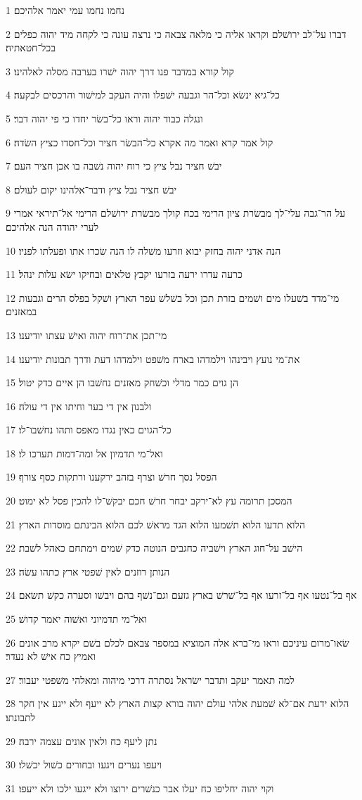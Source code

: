 \par 1 נחמו נחמו עמי יאמר אלהיכם׃
\par 2 דברו על־לב ירושׁלם וקראו אליה כי מלאה צבאה כי נרצה עונה כי לקחה מיד יהוה כפלים בכל־חטאתיה׃
\par 3 קול קורא במדבר פנו דרך יהוה ישׁרו בערבה מסלה לאלהינו׃
\par 4 כל־גיא ינשׂא וכל־הר וגבעה ישׁפלו והיה העקב למישׁור והרכסים לבקעה׃
\par 5 ונגלה כבוד יהוה וראו כל־בשׂר יחדו כי פי יהוה דבר׃
\par 6 קול אמר קרא ואמר מה אקרא כל־הבשׂר חציר וכל־חסדו כציץ השׂדה׃
\par 7 יבשׁ חציר נבל ציץ כי רוח יהוה נשׁבה בו אכן חציר העם׃
\par 8 יבשׁ חציר נבל ציץ ודבר־אלהינו יקום לעולם׃
\par 9 על הר־גבה עלי־לך מבשׂרת ציון הרימי בכח קולך מבשׂרת ירושׁלם הרימי אל־תיראי אמרי לערי יהודה הנה אלהיכם׃
\par 10 הנה אדני יהוה בחזק יבוא וזרעו משׁלה לו הנה שׂכרו אתו ופעלתו לפניו׃
\par 11 כרעה עדרו ירעה בזרעו יקבץ טלאים ובחיקו ישׂא עלות ינהל׃
\par 12 מי־מדד בשׁעלו מים ושׁמים בזרת תכן וכל בשׁלשׁ עפר הארץ ושׁקל בפלס הרים וגבעות במאזנים׃
\par 13 מי־תכן את־רוח יהוה ואישׁ עצתו יודיענו׃
\par 14 את־מי נועץ ויבינהו וילמדהו בארח משׁפט וילמדהו דעת ודרך תבונות יודיענו׃
\par 15 הן גוים כמר מדלי וכשׁחק מאזנים נחשׁבו הן איים כדק יטול׃
\par 16 ולבנון אין די בער וחיתו אין די עולה׃
\par 17 כל־הגוים כאין נגדו מאפס ותהו נחשׁבו־לו׃
\par 18 ואל־מי תדמיון אל ומה־דמות תערכו לו׃
\par 19 הפסל נסך חרשׁ וצרף בזהב ירקענו ורתקות כסף צורף׃
\par 20 המסכן תרומה עץ לא־ירקב יבחר חרשׁ חכם יבקשׁ־לו להכין פסל לא ימוט׃
\par 21 הלוא תדעו הלוא תשׁמעו הלוא הגד מראשׁ לכם הלוא הבינתם מוסדות הארץ׃
\par 22 הישׁב על־חוג הארץ וישׁביה כחגבים הנוטה כדק שׁמים וימתחם כאהל לשׁבת׃
\par 23 הנותן רוזנים לאין שׁפטי ארץ כתהו עשׂה׃
\par 24 אף בל־נטעו אף בל־זרעו אף בל־שׁרשׁ בארץ גזעם וגם־נשׁף בהם ויבשׁו וסערה כקשׁ תשׂאם׃
\par 25 ואל־מי תדמיוני ואשׁוה יאמר קדושׁ׃
\par 26 שׂאו־מרום עיניכם וראו מי־ברא אלה המוציא במספר צבאם לכלם בשׁם יקרא מרב אונים ואמיץ כח אישׁ לא נעדר׃
\par 27 למה תאמר יעקב ותדבר ישׂראל נסתרה דרכי מיהוה ומאלהי משׁפטי יעבור׃
\par 28 הלוא ידעת אם־לא שׁמעת אלהי עולם יהוה בורא קצות הארץ לא ייעף ולא ייגע אין חקר לתבונתו׃
\par 29 נתן ליעף כח ולאין אונים עצמה ירבה׃
\par 30 ויעפו נערים ויגעו ובחורים כשׁול יכשׁלו׃
\par 31 וקוי יהוה יחליפו כח יעלו אבר כנשׁרים ירוצו ולא ייגעו ילכו ולא ייעפו׃

